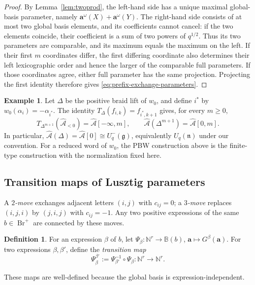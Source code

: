 \documentclass[12pt, reqno]{amsart}
\theoremstyle{plain}
\theoremstyle{definition}
\newtheorem{definition}[theorem]{Definition}
\newtheorem{example}[theorem]{Example}
\numberwithin{equation}{section}
\newcommand{\NN}{\mathbb{N}}
\newcommand{\Br}{{\operatorname{Br}}}
\begin{document}
\begin{proof}
By Lemma~\ref{lem:twoprod}, the left-hand side has a unique maximal
global-basis parameter, namely
$\mathbf a^\omega(X)+\mathbf a^\omega(Y)$.
The right-hand side consists of at most two global basis elements, and
its coefficients cannot cancel: if the two elements coincide, their
coefficient is a sum of two powers of $q^{1/2}$. Thus its two parameters
are comparable, and its maximum equals the maximum on the left.
If their first $m$ coordinates differ, the first differing coordinate
also determines their left lexicographic order and hence the larger
of the comparable full parameters. If those coordinates agree, either
full parameter has the same projection. Projecting the first identity
therefore gives \eqref{eq:prefix-exchange-parameters}.
\end{proof}

\begin{example}\label{exam:Delta}
Let $\Delta$ be the positive braid lift of $w_0$, and define $i^*$ by
$w_0(\alpha_i)=-\alpha_{i^*}$. The identity
$T_\Delta(f_{i,k})=f_{i^*,k+1}$ gives, for every $m\geq0$,
\[
    T_{\Delta^{m+1}}(\widehat{\mathcal A}_{<0})
    =\widehat{\mathcal A}[-\infty,m],\qquad
    \widehat{\mathcal A}(\Delta^{m+1})
    =\widehat{\mathcal A}[0,m].
\]
In particular,
$\widehat{\mathcal A}(\Delta)=\widehat{\mathcal A}[0]
\cong U_q^-(\mathfrak g)$, equivalently $U_q(\mathfrak n)$ under our
convention. For a reduced word of $w_0$, the PBW construction above is
the finite-type construction with the normalization fixed here.
\end{example}

\subsection{Transition maps of Lusztig parameters}

A \emph{$2$-move} exchanges adjacent letters $(i,j)$ with $c_{ij}=0$;
a \emph{$3$-move} replaces $(i,j,i)$ by $(j,i,j)$ with $c_{ij}=-1$.
Any two positive expressions of the same $b\in\Br^+$ are connected
by these moves.

\begin{definition}
For an expression $\beta$ of $b$, let
$\Psi_\beta:\mathbb N^r\to\mathbb B(b)$, $\mathbf a\mapsto G^\beta(\mathbf a)$.
For two expressions $\beta,\beta'$, define the \emph{transition map}
\[
\Psi_\beta^{\beta'}:=\Psi_{\beta'}^{-1}\circ\Psi_\beta:\NN^r\to\NN^r.
\]
\end{definition}
These maps are well-defined because the global basis is expression-independent.
\end{document}
